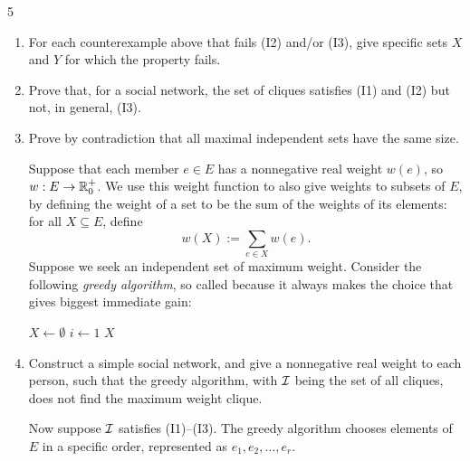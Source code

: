 \documentclass[11pt]{article}
\begin{document}
\begin{exercise}{5}
    \begin{enumerate}[label=(\alph*)]
        \item For each counterexample above that fails (I2) and/or
            (I3), give specific sets $X$ and $Y$ for which the
            property fails.

        \item Prove that, for a social network, the set of cliques
            satisfies (I1) and (I2) but not, in general, (I3).

        \item Prove by contradiction that all maximal independent
            sets have the same size.

            Suppose that each member $e \in E$ has a nonnegative real
            weight $w(e)$, so $w: E \to \mathbb{R}_0^+$. We use this weight
            function to also give weights to subsets of $E$, by
            defining the weight of a set to be the sum of the weights
            of its elements: for all $X \subseteq E$, define
            \[
                w(X) := \sum_{e \in X} w(e).
            \]
            Suppose we seek an independent set of maximum weight.
            Consider the following \emph{greedy algorithm}, so called
            because it always makes the choice that gives biggest
            immediate gain:

            \begin{algorithm}[H]
                \DontPrintSemicolon
                $X \gets \emptyset$\;
                $i \gets 1$\;
                \Return $X$\;
                \caption{Greedy algorithm for maximum weight independent set}
            \end{algorithm}

        \item Construct a simple social network, and give a
            nonnegative real weight to each person, such that the
            greedy algorithm, with $\mathcal{I}$ being the set of all cliques,
            does not find the maximum weight clique.

            Now suppose $\mathcal{I}$ satisfies (I1)--(I3). The greedy
            algorithm chooses elements of $E$ in a specific order,
            represented as $e_1, e_2, \dots, e_r$.


\end{enumerate}
\end{exercise}
\end{document}
